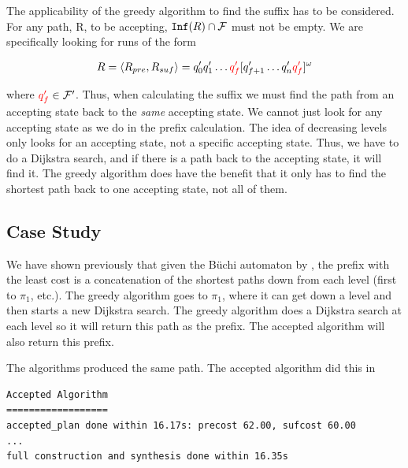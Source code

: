 The applicability of the greedy algorithm to find the suffix has to be considered. For any path, R, to be accepting, $\texttt{Inf}(R) \cap \mathcal{F}$ must not be empty. We are specifically looking for runs of the form 

\begin{align*}
R &= \langle R_{pre}, R_{suf} \rangle = q_0' q_1' \dots {\color{red} q_f'} [q_{f+1}' \dots q_n' {\color{red} q_f'}]^\omega \\
\end{align*}

where ${\color{red} q_f'} \in \mathcal{F}'$. Thus, when calculating the suffix we must find the path from an accepting state back to the \textit{same} accepting state. We cannot just look for any accepting state as we do in the prefix calculation. The idea of decreasing levels only looks for an accepting state, not a specific accepting state. Thus, we have to do a Dijkstra search, and if there is a path back to the accepting state, it will find it. The greedy algorithm does have the benefit that it only has to find the shortest path back to one accepting state, not all of them.


\subsection{Case Study}





We have shown previously that given the B\"{u}chi automaton by \cite{ltlbuchiwebsite}, the prefix with the least cost is a concatenation of the shortest paths down from each level (first to $\pi_1$, etc.). The greedy algorithm goes to $\pi_1$, where it can get down a level and then starts a new Dijkstra search. The greedy algorithm does a Dijkstra search at each level so it will return this path as the prefix. The accepted algorithm will also return this prefix. 

The algorithms produced the same path. The accepted algorithm did this in \\


\begin{minipage}{\textwidth}
\begingroup
\fontsize{9pt}{12pt}\selectfont
\begin{lstlisting}
Accepted Algorithm
==================
accepted_plan done within 16.17s: precost 62.00, sufcost 60.00
...
full construction and synthesis done within 16.35s 
\end{lstlisting}
\endgroup
\end{minipage} \\ \\


